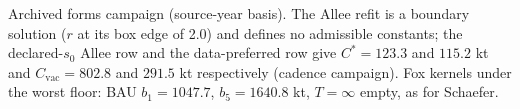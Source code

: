 \documentclass[11pt,a4paper]{article}
\begin{document}
\begin{table}[H]
\centering
\caption{Cod: alternative surplus forms on the frozen window.}
\label{tab:si-forms}
\small
{}
\par\smallskip\begin{minipage}{0.97\linewidth}\footnotesize Archived forms campaign (source-year basis). The Allee refit is a boundary solution ($r$ at its box edge of 2.0) and defines no admissible constants; the declared-$s_0$ Allee row and the data-preferred row give $C^*=123.3$ and $115.2$ kt and $C_{\mathrm{vac}}=802.8$ and $291.5$ kt respectively (cadence campaign). Fox kernels under the worst floor: BAU $b_1=1047.7$, $b_5=1640.8$ kt, $T=\infty$ empty, as for Schaefer.\end{minipage}
\end{table}
\end{document}
